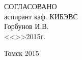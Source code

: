 \vfill

\begin{flushleft}
\begin{minipage}{0.45\textwidth}
 \begin{flushleft}
  СОГЛАСОВАНО \\
  аспирант каф. КИБЭВС \\
  \underline{\hspace{3cm}}Горбунов И.В. \\
  <<\underline{\hspace{1cm}}>>\underline{\hspace{3cm}}2015г.\\
 \end{flushleft}
\end{minipage}
\end{flushleft}

\vfill

\begin{center}
 Томск 2015
\end{center}
